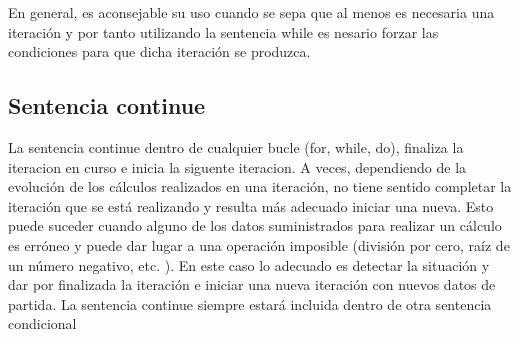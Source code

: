 \documentclass[11pt,a4paper]{article}
\begin{document}
  En general, es aconsejable su uso cuando se sepa que al
  menos es necesaria una iteración y por tanto utilizando la sentencia while es
  nesario forzar las condiciones para que dicha iteración se produzca.
  \subsection{Sentencia continue}
  La sentencia continue dentro de cualquier bucle (for, while, do), finaliza la iteracion en curso e inicia la siguente iteracion. A veces, dependiendo
  de la evolución de los cálculos realizados en una iteración, no tiene
  sentido completar la iteración que se está realizando y resulta más adecuado
  iniciar una nueva. Esto puede suceder cuando alguno de los datos suministrados
  para realizar un cálculo es erróneo y puede dar lugar a una operación
  imposible (división por cero, raíz de un número negativo, etc. ). En este caso lo adecuado es detectar la situación y dar por finalizada la iteración e iniciar una nueva iteración con nuevos datos de partida. La sentencia continue siempre estará incluida dentro de otra sentencia condicional 
\end{document}
